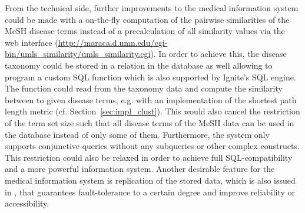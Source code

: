 From the technical side, further improvements to the medical information system could be made with a on-the-fly computation of the pairwise similarities of the 
MeSH disease terms instead of a precalculation of all similarity values via the  web interface 
(\url{http://maraca.d.umn.edu/cgi-bin/umls_similarity/umls_similarity.cgi}). In order to achieve this, the disease taxonomy could be stored in a relation in the
database as well allowing to program a custom SQL function which is also supported by Ignite's SQL engine. The function could read from the taxonomy data and 
compute the similarity between to given disease terms, e.g. with an implementation of the shortest path length metric (cf. Section~\ref{sec:impl_clust}). This 
would also cancel the restriction of the term set size such that all disease terms of the MeSH data can be used in the database instead of only some of them.
Furthermore, the system only supports conjunctive queries without any subqueries or other complex constructs. This restriction could also be relaxed in order to
achieve full SQL-compatibility and a more powerful information system. Another desirable feature for the medical information system is replication of the stored 
data, which is also issued in \citet{Wiese2014}, that guarantees fault-tolerance to a certain degree and improve reliability or accessibility.